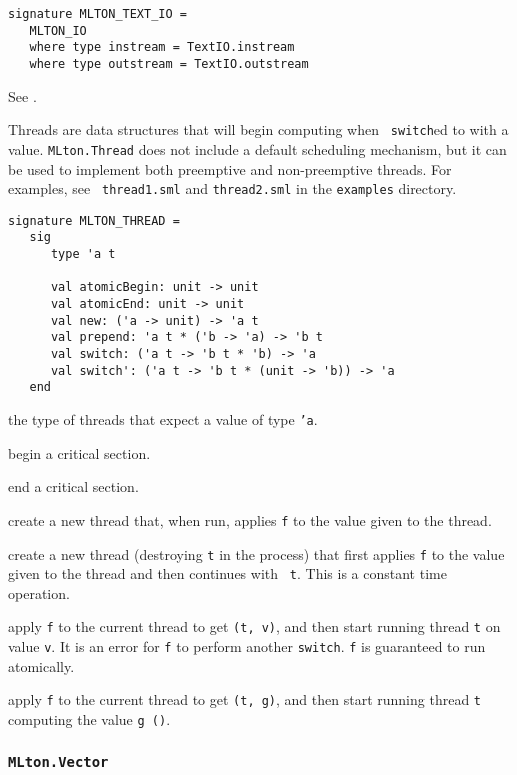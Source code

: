 \begin{verbatim}
signature MLTON_TEXT_IO =
   MLTON_IO
   where type instream = TextIO.instream
   where type outstream = TextIO.outstream
\end{verbatim}

See .

Threads are data structures that will begin computing when {\tt
switch}ed to with a value.  {\tt MLton.Thread} does not include a
default scheduling mechanism, but it can be used to implement both
preemptive and non-preemptive threads.  For examples, see {\tt
thread1.sml} and {\tt thread2.sml} in the {\tt examples} directory.
\begin{verbatim}
signature MLTON_THREAD =
   sig
      type 'a t

      val atomicBegin: unit -> unit
      val atomicEnd: unit -> unit
      val new: ('a -> unit) -> 'a t
      val prepend: 'a t * ('b -> 'a) -> 'b t
      val switch: ('a t -> 'b t * 'b) -> 'a
      val switch': ('a t -> 'b t * (unit -> 'b)) -> 'a
   end
\end{verbatim}

\begin{description}

the type of threads that expect a value of type {\tt 'a}.

begin a critical section.

end a critical section.

create a new thread that, when run, applies {\tt f} to the
value given to the thread. 

create a new thread (destroying {\tt t} in the process) that first applies
{\tt f} to the value given to the thread and then continues with {\tt
t}.  This is a constant time operation.

apply {\tt f} to the current thread to get {\tt (t, v)}, and then
start running thread {\tt t} on value {\tt v}.  It is an error for
{\tt f} to perform another {\tt switch}.  {\tt f} is guaranteed
to run atomically.

apply {\tt f} to the current thread to get {\tt (t, g)}, and then
start running thread {\tt t} computing the value {\tt g ()}.

\end{description}
%
\subsubsection{\tt MLton.Vector}

